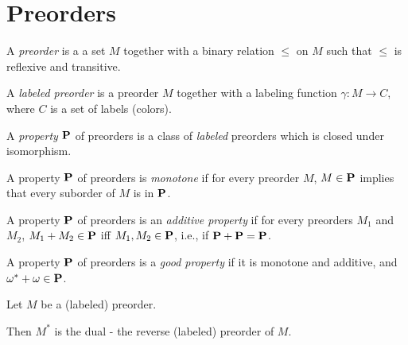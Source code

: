 \section{Preorders}

\begin{definitions}
  A \emph{preorder} is a a set $M$
  together with a binary relation $\le$ on $M$ such that
  $\le$ is reflexive and transitive.

  A \emph{labeled preorder} is a preorder $M$ together with a labeling function
  $\gamma : M \to C$, where $C$ is a set of labels (colors).
\end{definitions}

\begin{definition}
  A \emph{property} $\mathbf{P}$ of preorders is a class of \emph{labeled} preorders which
  is closed under isomorphism.
\end{definition}

\begin{definition}
  A property $\mathbf{P}$ of preorders is \emph{monotone} if for every preorder $M$,
  $M \in \mathbf{P}$ implies that every suborder of $M$ is in $\mathbf{P}$.
\end{definition}

\begin{definition}
  A property $\mathbf{P}$ of preorders is an \emph{additive property} if for every preorders $M_1$ and $M_2$,
  $M_1 + M_2 \in \mathbf{P}$ iff $M_1, M_2 \in \mathbf{P}$, i.e., if $\mathbf{P} + \mathbf{P} = \mathbf{P}$.
\end{definition}

\begin{definition}
  A property $\mathbf{P}$ of preorders is a \emph{good property} if it is monotone and additive,
  and $\omega^\ast + \omega \in \mathbf{P}$.
\end{definition}

\begin{definition}
  Let $M$ be a (labeled) preorder.

  Then $M^\ast$ is the dual - the reverse (labeled) preorder of $M$.
\end{definition}

